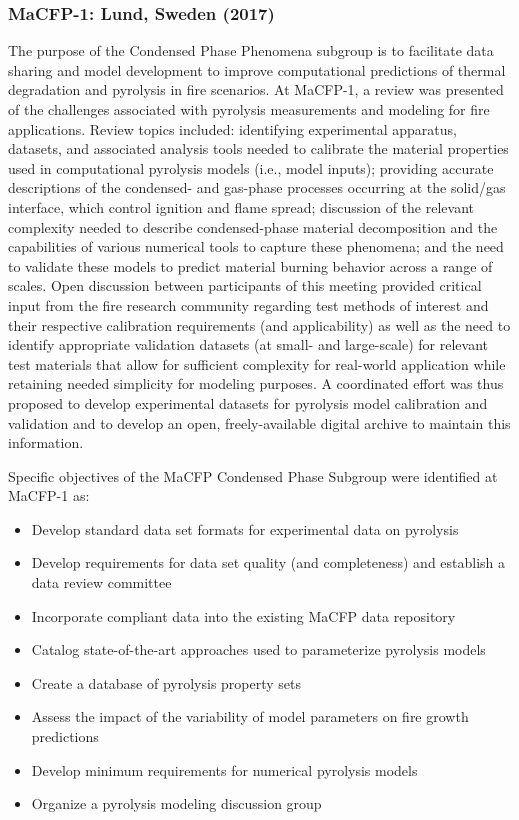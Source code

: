 \documentclass[12pt]{article}
\begin{document}
\subsubsection{MaCFP-1: Lund, Sweden (2017)}
The purpose of the Condensed Phase Phenomena subgroup is to facilitate data sharing and model development to improve computational predictions of thermal degradation and pyrolysis in fire scenarios. At MaCFP-1, a review was  presented of the challenges associated with pyrolysis measurements and modeling for fire applications. Review topics included: identifying experimental apparatus, datasets, and associated analysis tools needed to calibrate the material properties used in computational pyrolysis models (i.e., model inputs); providing accurate descriptions of the condensed- and gas-phase processes occurring at the solid/gas interface, which control ignition and flame spread; discussion of the relevant complexity needed to describe condensed-phase material decomposition and the capabilities of various numerical tools to capture these phenomena; and the need to validate these models to predict material burning behavior across a range of scales. Open discussion between participants of this meeting provided critical input from the fire research community regarding test methods of interest and their respective calibration requirements (and applicability) as well as the need to identify appropriate validation datasets (at small- and large-scale) for relevant test materials that allow for sufficient complexity for real-world application while retaining needed simplicity for modeling purposes. A coordinated effort was thus proposed to develop experimental datasets for pyrolysis model calibration and validation and to develop an open, freely-available digital archive to maintain this information.

Specific objectives of the MaCFP Condensed Phase Subgroup were identified at MaCFP-1 as:
\begin{itemize}[noitemsep]
\item Develop standard data set formats for experimental data on pyrolysis
\item Develop requirements for data set quality (and completeness) and establish a data review committee
\item Incorporate compliant data into the existing MaCFP data repository
\item Catalog state-of-the-art approaches used to parameterize pyrolysis models
\item Create a database of pyrolysis property sets
\item Assess the impact of the variability of model parameters on fire growth predictions
\item Develop minimum requirements for numerical pyrolysis models
\item Organize a pyrolysis modeling discussion group
\end{itemize}
\end{document}
